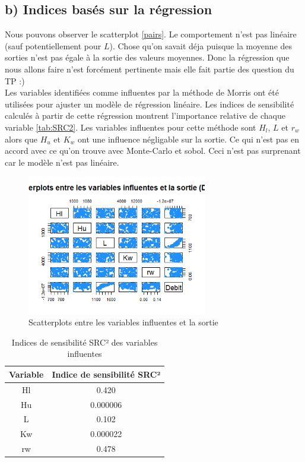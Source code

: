 \documentclass[a4paper,12pt]{article}
\begin{document}
\subsection{b) Indices basés sur la régression}
Nous pouvons observer le scatterplot \autoref{pairs}. Le comportement n'est pas linéaire (sauf potentiellement pour \(L\)). Chose qu'on savait déja puisque la moyenne des sorties n'est pas égale à la sortie des valeurs moyennes. Donc la régression que nous allons faire n'est forcément pertinente mais elle fait partie des question du TP :) 
\\
Les variables identifiées comme influentes par la méthode de Morris ont été utilisées pour ajuster un modèle de régression linéaire. Les indices de sensibilité calculés à partir de cette régression montrent l'importance relative de chaque variable \autoref{tab:SRC2}. Les variables influentes pour cette méthode sont \(H_l\), \(L\) et \(r_w\) alors que \(H_u\) et \(K_w\) ont une influence négligable sur la sortie. Ce qui n'est pas en accord avec ce qu'on trouve avec Monte-Carlo et sobol. Ceci n'est pas surprenant car le modèle n'est pas linéaire.
\begin{figure}[H]
    \centering
    \includegraphics[width=0.7\textwidth]{pairs.png}
    \caption{Scatterplots entre les variables influentes et la sortie}
    \label{pairs}
\end{figure}
\begin{table}[H]
    \centering
    \begin{tabular}{|c|c|}
        \hline
        \textbf{Variable} & \textbf{Indice de sensibilité SRC²} \\
        \hline
        Hl & 0.420 \\
        Hu & 0.000006 \\
        L  & 0.102 \\
        Kw & 0.000022 \\
        rw & 0.478 \\
        \hline
    \end{tabular}
    \caption{Indices de sensibilité SRC² des variables influentes}
    \label{tab:SRC2}
\end{table} 
\end{document}
